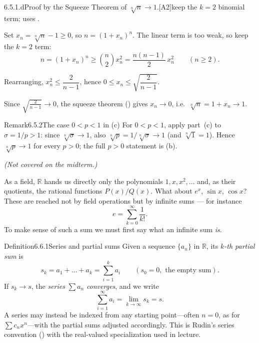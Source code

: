 \documentclass[main.tex]{subfiles}
\begin{document}
\begin{Prf}{6.5.1.d}{Proof by the Squeeze Theorem of $\sqrt[n]{n}\to1$.}{[A2]\quad keep the $k=2$ binomial term; uses .}
\item Set $x_n=\sqrt[n]{n}-1\ge0$, so $n=(1+x_n)^n$. The linear term is too weak, so keep the $k=2$ term:
  \[ n=(1+x_n)^n\ge\binom{n}{2}x_n^2=\frac{n(n-1)}{2}\,x_n^2\qquad(n\ge2). \]
\item Rearranging, $x_n^2\le\dfrac{2}{n-1}$, hence $0\le x_n\le\sqrt{\dfrac{2}{n-1}}$.
\item Since $\sqrt{\tfrac{2}{n-1}}\to0$, the squeeze theorem () gives $x_n\to0$, i.e.\ $\sqrt[n]{n}=1+x_n\to1$.
\end{Prf}

\begin{ObjL}{Remark}{6.5.2}{The case $0<p<1$ in (c)}
For $0<p<1$, apply part~(c) to $\sigma=1/p>1$: since $\sqrt[n]{\sigma}\to1$, also
$\sqrt[n]{p}=1/\sqrt[n]{\sigma}\to1$ (and $\sqrt[n]{1}=1$). Hence $\sqrt[n]{p}\to1$ for every
$p>0$; the full $p>0$ statement is (b).
\end{ObjL}


{\itshape\small (Not covered on the midterm.)}\par\smallskip
\noindent As a field, $\mathbb R$ hands us directly only the polynomials $1,x,x^2,\dots$ and,
as their quotients, the rational functions $P(x)/Q(x)$. What about $e^x$, $\sin x$, $\cos x$?
These are reached not by field operations but by infinite sums --- for instance
\[ e=\sum_{k=0}^\infty\frac{1}{k!}. \]
To make sense of such a sum we must first say what an infinite sum \emph{is}.

\begin{Obj}{Definition}{6.6.1}{Series and partial sums}
Given a sequence $\{a_n\}$ in $\mathbb R$, its \emph{$k$-th partial sum} is
\[ s_k=a_1+\dots+a_k=\sum_{i=1}^k a_i\qquad(s_0=0,\text{ the empty sum}). \]
If $s_k\to s$, the \emph{series} $\sum a_n$ \emph{converges}, and we write
\[ \sum_{i=1}^\infty a_i=\lim_{k\to\infty}s_k=s . \]
A series may instead be indexed from any starting point---often $n=0$, as for $\sum c_n x^n$---with
the partial sums adjusted accordingly.
This is Rudin's series convention () with the real-valued specialization used in lecture.
\end{Obj}
\end{document}
